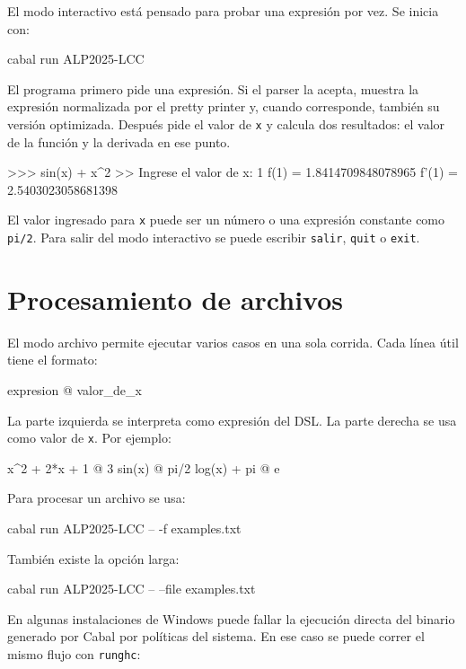 \documentclass[11pt,a4paper]{article}
\newenvironment{codeblock}{\verbatim}{\endverbatim}
\begin{document}
El modo interactivo está pensado para probar una expresión por vez. Se inicia con:

\begin{codeblock}
cabal run ALP2025-LCC
\end{codeblock}

El programa primero pide una expresión. Si el parser la acepta, muestra la expresión normalizada por el pretty printer y, cuando corresponde, también su versión optimizada. Después pide el valor de \texttt{x} y calcula dos resultados: el valor de la función y la derivada en ese punto.

\begin{codeblock}
>>> sin(x) + x^2
>> Ingrese el valor de x: 1
f(1) = 1.8414709848078965
f'(1) = 2.5403023058681398
\end{codeblock}

El valor ingresado para \texttt{x} puede ser un número o una expresión constante como \texttt{pi/2}. Para salir del modo interactivo se puede escribir \texttt{salir}, \texttt{quit} o \texttt{exit}.

\section{Procesamiento de archivos}

El modo archivo permite ejecutar varios casos en una sola corrida. Cada línea útil tiene el formato:

\begin{codeblock}
expresion @ valor_de_x
\end{codeblock}

La parte izquierda se interpreta como expresión del DSL. La parte derecha se usa como valor de \texttt{x}. Por ejemplo:

\begin{codeblock}
x^2 + 2*x + 1 @ 3
sin(x) @ pi/2
log(x) + pi @ e
\end{codeblock}

Para procesar un archivo se usa:

\begin{codeblock}
cabal run ALP2025-LCC -- -f examples\basico.txt
\end{codeblock}

También existe la opción larga:

\begin{codeblock}
cabal run ALP2025-LCC -- --file examples\basico.txt
\end{codeblock}

En algunas instalaciones de Windows puede fallar la ejecución directa del binario generado por Cabal por políticas del sistema. En ese caso se puede correr el mismo flujo con \texttt{runghc}:
\end{document}
